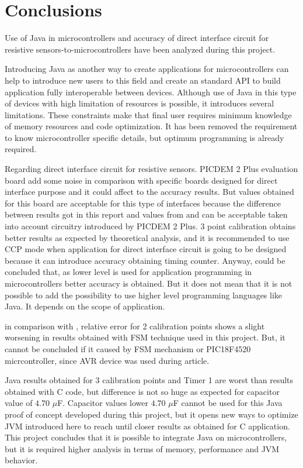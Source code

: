 \chapter{Conclusions}\label{C:Conclusions}
Use of Java in microcontrollers and accuracy of direct interface circuit for resistive sensors-to-microcontrollers have been analyzed during this project.

Introducing Java as another way to create applications for microcontrollers can help to introduce new users to this field and create an standard API to build application fully interoperable between devices. Although use of Java in this type of devices with high limitation of resources is possible, it introduces several limitations. These constraints make that final user requires minimum knowledge of memory resources and code optimization. It has been removed the requirement to know microcontroller specific details, but optimum programming is already required.
 
Regarding direct interface circuit for resistive sensors. PICDEM 2 Plus evaluation board add some noise in comparison with specific boards designed for direct interface purpose and it could affect to the accuracy results. But values obtained for this board are acceptable for this type of interfaces because the difference between results got in this report and values from \cite{Art:Uncertainty} and \cite{Art:Accuracy} can be acceptable taken into account circuitry introduced by PICDEM 2 Plus. 3 point calibration obtains better results as expected by theoretical analysis, and it is recommended to use CCP mode when application for direct interface circuit is going to be designed because it can introduce accuracy obtaining timing counter. Anyway, could be concluded that, as lower level is used for application programming in microcontrollers better accuracy is obtained. But it does not mean that it is not possible to add the possibility to use higher level programming languages like Java. It depends on the scope of application.

in comparison with \cite{Art:Accuracy}, relative error for 2 calibration points shows a slight worsening in results obtained with FSM technique used in this project. But, it cannot be concluded if it caused by FSM mechanism or PIC18F4520 micrcontroller, since AVR device was used during \cite{Art:Accuracy} article.

Java results obtained for 3 calibration points and Timer 1 are worst than results obtained with C code, but difference is not so huge as expected for capacitor value of $4.70$ $\mu$F. Capacitor values lower $4.70$ $\mu$F cannot be used for this Java proof of concept developed during this project, but it opens new ways to optimize JVM introduced here to reach until closer results as obtained for C application. This project concludes that it is possible to integrate Java on microcontrollers, but it is required higher analysis in terms of memory, performance and JVM behavior.
